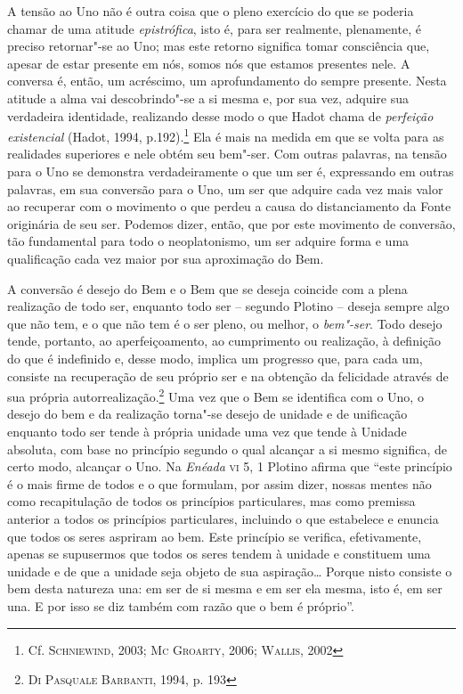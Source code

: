 A tensão ao Uno não é outra coisa que o pleno exercício do que se poderia 
chamar de uma atitude \textit{epistrófica}, isto é, para ser realmente,
plenamente, é preciso retornar"-se ao Uno; mas este retorno significa tomar
consciência que, apesar de estar presente em nós, somos nós que estamos
presentes nele. A conversa é, então, um acréscimo, um aprofundamento do sempre
presente. Nesta atitude a alma vai descobrindo"-se a si mesma e, por sua vez,
adquire sua verdadeira identidade, realizando desse modo o que Hadot chama de
\textit{perfeição existencial} (Hadot, 1994, p.192).\footnote{
     Cf. \textsc{Schniewind}, 2003; \textsc{Mc Groarty}, 2006; \textsc{Wallis}, 2002}
Ela é mais na medida em que
se volta para as realidades superiores e nele obtém seu bem"-ser. Com outras
palavras, na tensão para o Uno se demonstra verdadeiramente o que um ser é,
expressando em outras palavras, em sua conversão para o Uno, um ser que adquire
cada vez
mais valor ao recuperar com o movimento o que perdeu a causa do distanciamento
da Fonte originária de seu ser. Podemos dizer, então, que por este movimento de
conversão, tão fundamental para todo o neoplatonismo, um ser adquire forma e
uma qualificação cada vez maior por sua aproximação do Bem. 

A conversão é desejo do Bem e o Bem que se deseja coincide com a plena
realização de todo ser, enquanto todo ser -- segundo Plotino -- deseja sempre
algo que não tem, e o que não tem é o ser pleno, ou melhor, o \textit{bem"-ser}.
Todo desejo tende, portanto, ao aperfeiçoamento, ao cumprimento ou realização, à
definição do que é indefinido e, desse modo, implica um progresso que, para cada
um, consiste na recuperação de seu próprio ser e na obtenção da felicidade
através de sua própria autorrealização.\footnote{
  \textsc{Di Pasquale Barbanti}, 1994, p. 193
  } Uma vez que o Bem se identifica com o
Uno, o desejo do bem e da realização torna"-se desejo de unidade e de unificação
enquanto todo ser tende à própria unidade uma vez que tende à Unidade absoluta,
com base no princípio segundo o qual alcançar a si mesmo significa, de certo
modo, alcançar o Uno. Na \textit{Enéada} \textsc{vi} 5, 1 Plotino afirma que
``este princípio é o mais firme de todos e o que formulam, por assim dizer,
nossas mentes não como recapitulação de todos os princípios particulares, mas
como premissa anterior a todos os princípios particulares, incluindo o que
estabelece e enuncia que todos os seres aspriram ao bem. Este princípio  se
verifica, efetivamente, apenas se supusermos que todos os seres tendem à unidade e
constituem uma unidade e de que a unidade seja objeto de sua aspiração\ldots{}
Porque nisto consiste o bem desta natureza una: em ser de si mesma e em ser ela
mesma, isto é, em ser una. E por isso se diz também com razão que o bem é
próprio''.

